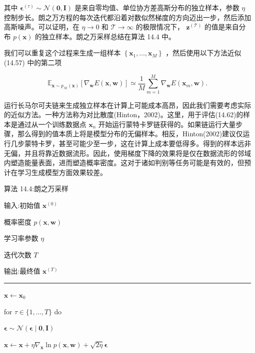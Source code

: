 \documentclass[10pt]{report}
\newcommand{\HRule}{\begin{center}\rule{0.9\linewidth}{0.2mm}\end{center}}
\begin{document}
其中 \({\mathbf{\epsilon }}^{\left( \tau \right) } \sim  \mathcal{N}\left( {\mathbf{0},\mathbf{I}}\right)\) 是来自零均值、单位协方差高斯分布的独立样本，参数 \(\eta\) 控制步长。朗之万方程的每次迭代都沿着对数似然梯度的方向迈出一步，然后添加高斯噪声。可以证明，在 \(\eta  \rightarrow  0\) 和 \(\mathcal{T} \rightarrow  \infty\) 的极限情况下， \({\mathbf{z}}^{\left( \mathcal{T}\right) }\) 的值是来自分布 \(p\left( \mathbf{x}\right)\) 的独立样本。朗之万采样总结在算法 14.4 中。

我们可以重复这个过程来生成一组样本 \(\left\{  {{\mathbf{x}}_{1},\ldots ,{\mathbf{x}}_{M}}\right\}\) ，然后使用以下方法近似 (14.57) 中的第二项

\[
{\mathbb{E}}_{\mathbf{x} \sim  {p}_{\mathcal{M}}\left( \mathbf{x}\right) }\left\lbrack  {{\nabla }_{\mathbf{w}}E\left( {\mathbf{x},\mathbf{w}}\right) }\right\rbrack   \simeq  \frac{1}{M}\mathop{\sum }\limits_{{m = 1}}^{M}{\nabla }_{\mathbf{w}}E\left( {{\mathbf{x}}_{m},\mathbf{w}}\right) . \tag{14.62}
\]

运行长马尔可夫链来生成独立样本在计算上可能成本高昂，因此我们需要考虑实际的近似方法。一种方法称为对比散度(Hinton，2002)。这里，用于评估(14.62)的样本是通过从一个训练数据点 \({\mathbf{x}}_{n}\) 开始运行蒙特卡罗链获得的。如果链运行大量步骤，那么得到的值本质上将是模型分布的无偏样本。相反，Hinton(2002)建议仅运行几步蒙特卡罗，甚至可能少至一步，这在计算上成本要低得多。得到的样本远非无偏，并且将靠近数据流形。因此，使用梯度下降的效果将是仅在数据流形的邻域内塑造能量表面，进而塑造概率密度。这对于诸如判别等任务可能是有效的，但预计在学习生成模型方面效果较差。

算法 14.4:朗之万采样

输入:初始值 \({\mathbf{x}}^{\left( 0\right) }\)

概率密度 \(p\left( {\mathbf{x},\mathbf{w}}\right)\)

学习率参数 \(\eta\)

迭代次数 \(T\)

输出:最终值 \({\mathbf{x}}^{\left( T\right) }\)

\HRule

\(\mathbf{x} \leftarrow  {\mathbf{x}}_{0}\)

for \(\tau  \in  \{ 1,\ldots ,T\}\) do

\hspace*{1em} \(\mathbf{\epsilon } \sim  \mathcal{N}\left( {\mathbf{\epsilon } \mid  \mathbf{0},\mathbf{I}}\right)\)

\hspace*{1em} \(\mathbf{x} \leftarrow  \mathbf{x} + \eta {\nabla }_{\mathbf{x}}\ln p\left( {\mathbf{x},\mathbf{w}}\right)  + \sqrt{2\eta }\mathbf{\epsilon }\)
\end{document}
